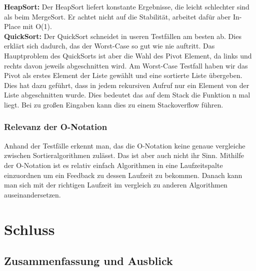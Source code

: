 \documentclass{article}
\begin{document}
\textbf{HeapSort:} Der HeapSort liefert konstante Ergebnisse, die leicht schlechter sind als beim MergeSort. Er achtet nicht auf die Stabilität, arbeitet dafür aber In-Place mit O(1).\\

\textbf{QuickSort:} Der QuickSort schneidet in useren Testfällen am besten ab. Dies erklärt sich dadurch, das der Worst-Case so gut wie nie auftritt. Das Hauptproblem des QuickSorts ist aber die Wahl des Pivot Element, da links und rechts davon jeweils abgeschnitten wird. Am Worst-Case Testfall haben wir das Pivot als erstes Element der Liste gewählt und eine sortierte Liste übergeben. Dies hat dazu geführt, dass in jedem rekursiven Aufruf nur ein Element von der Liste abgeschnitten wurde. Dies bedeutet das auf dem Stack die Funktion n mal liegt. Bei zu großen Eingaben kann dies zu einem Stackoverflow führen. \\






\subsubsection{Relevanz der O-Notation}
Anhand der Testfälle erkennt man, das die O-Notation keine genaue vergleiche zwischen Sortieralgorithmen zulässt. Das ist aber auch nicht ihr Sinn. Mithilfe der O-Notation ist es relativ einfach Algorithmen in eine Laufzeitspalte einzuordnen um ein Feedback zu dessen Laufzeit zu bekommen. Danach kann man sich mit der richtigen Laufzeit im vergleich zu anderen Algorithmen auseinandersetzen.


\section{Schluss}
\subsection{Zusammenfassung und Ausblick}
\end{document}
